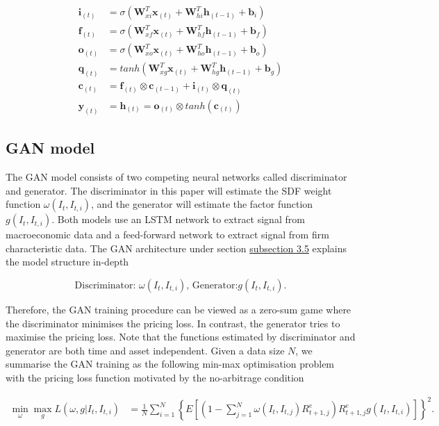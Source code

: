 \documentclass[12pt]{article}
\begin{document}
\begin{align*}
\mathbf{i}_{(t)} &= \sigma(
    \mathbf{W}_{xi}^T \mathbf{x}_{(t)}
    + \mathbf{W}_{hi}^T\mathbf{h}_{(t-1)} + \mathbf{b}_i
) \\
\mathbf{f}_{(t)} &= \sigma(
    \mathbf{W}_{xf}^T\mathbf{x}_{(t)} + \mathbf{W}_{hf}^T
    \mathbf{h}_{(t-1)} + \mathbf{b}_f
) \\
\mathbf{o}_{(t)} &= \sigma(
    \mathbf{W}_{xo}^T \mathbf{x}_{(t)} +
    \mathbf{W}_{ho}^T\mathbf{h}_{(t-1)} + \mathbf{b}_o
) \\
\mathbf{q}_{(t)} &= tanh(
    \mathbf{W}_{xg}^T \mathbf{x}_{(t)} +
    \mathbf{W}^T_{hg}\mathbf{h}_{(t-1)} + \mathbf{b}_g
) \\
\mathbf{c}_{(t)} &= \mathbf{f}_{(t)} \otimes \mathbf{c}_{(t-1)} + 
    \mathbf{i}_{(t)}\otimes \mathbf{q}_{(t)}\\
\mathbf{y}_{(t)} &= \mathbf{h}_{(t)} = \mathbf{o}_{(t)}
\otimes tanh(\mathbf{c}_{(t)})
\end{align*}

\hypertarget{gan_model}{%
\subsection{GAN model}\label{gan_model}}

The GAN model consists of two competing neural networks called
discriminator and generator. The discriminator in this paper
will estimate the SDF weight function \(\omega(I_t, I_{t, i})\), and the generator will estimate the factor function
\(g(I_t, I_{t, i})\). Both models use an
LSTM network to extract signal from macroeconomic data and a
feed-forward network to extract signal from firm characteristic data.
The GAN architecture under section \protect\hyperlink{gan_structure}{subsection 3.5}
explains the model structure in-depth

\[
\text{Discriminator: } \omega(I_t, I_{t, i})
\text{, Generator:} g(I_t, I_{t, i}).
\]

Therefore, the GAN training procedure can be viewed as a
zero-sum game where the discriminator minimises the
pricing loss. In contrast, the generator tries to maximise the
pricing loss. Note that the functions estimated by
discriminator and generator are both time and asset
independent. Given a data size \(N\), we summarise the GAN training as the following
min-max optimisation problem with the pricing loss function
motivated by the no-arbitrage condition

\begin{align*}
    \min_{\omega} \max_{g} L(\omega, g|I_t, I_{t, i}) &=
    \frac{1}{N} \sum_{i=1}^N \left\{
    E \left[ \left( 1 - \sum_{j=1}^N \omega(I_t, I_{t, j})
    R^e_{t+1, j} \right) R^e_{t+1, j}g(I_t, I_{t, i})
    \right] \right\}^2.
\end{align*}
\end{document}
